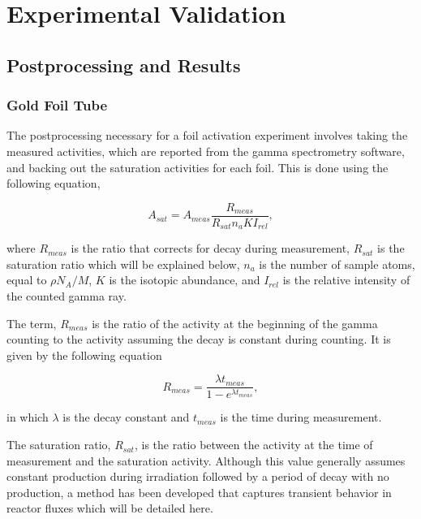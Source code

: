 
\cleardoublepage


\chapter{Experimental Validation}



\section{Postprocessing and Results}


\subsection{Gold Foil Tube}


The postprocessing necessary for a foil activation experiment involves taking the measured activities, which are reported from the gamma spectrometry software, and backing out the saturation activities for each foil.
This is done using the following equation,

\begin{equation}
\label{eqn:a_sat}
A_{sat} = A_{meas} \frac{R_{meas}}{R_{sat} n_a K I_{rel}} ,
\end{equation}

where $R_{meas}$ is the ratio that corrects for decay during measurement, $R_{sat}$ is the saturation ratio which will be explained below, $n_a$ is the number of sample atoms, equal to $\rho N_A / M$, $K$ is the isotopic abundance, and $I_{rel}$ is the relative intensity of the counted gamma ray.

The term, $R_{meas}$ is the ratio of the activity at the beginning of the gamma counting to the activity assuming the decay is constant during counting.
It is given by the following equation

\begin{equation}
\label{eqn:r_meas}
R_{meas} = \frac{\lambda t_{meas}}{1 - e^{\lambda t_{meas}}},
\end{equation}

in which $\lambda$ is the decay constant and $t_{meas}$ is the time during measurement.

The saturation ratio, $R_{sat}$, is the ratio between the activity at the time of measurement and the saturation activity.
Although this value generally assumes constant production during irradiation followed by a period of decay with no production, a method has been developed that captures transient behavior in reactor fluxes which will be detailed here.

